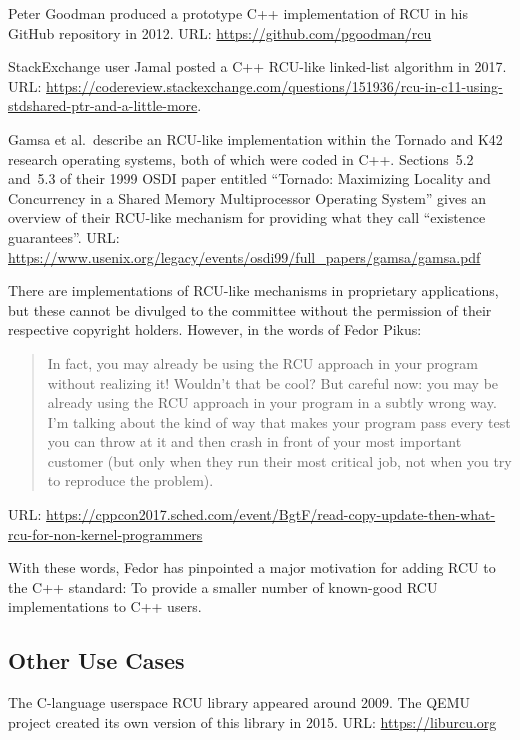 Peter Goodman produced a prototype C++ implementation of RCU in his
GitHub repository in 2012.
URL: \url{https://github.com/pgoodman/rcu}

StackExchange user Jamal posted a C++ RCU-like linked-list algorithm
in 2017.
URL: \url{https://codereview.stackexchange.com/questions/151936/rcu-in-c11-using-stdshared-ptr-and-a-little-more}.

Gamsa et al.~describe an RCU-like implementation within the Tornado
and K42 research operating systems, both of which were coded in C++.
Sections~5.2 and~5.3 of their 1999 OSDI paper entitled ``Tornado: Maximizing
Locality and Concurrency in a Shared Memory Multiprocessor Operating
System'' gives an overview of their RCU-like mechanism for providing
what they call ``existence guarantees''.
URL: \url{https://www.usenix.org/legacy/events/osdi99/full_papers/gamsa/gamsa.pdf}

There are implementations of RCU-like mechanisms in proprietary
applications, but these cannot be divulged to the committee without the
permission of their respective copyright holders.
However, in the words of Fedor Pikus:

\begin{quote}
	In fact, you may already be using the RCU approach in your program
	without realizing it! Wouldn't that be cool? But careful now:
	you may be already using the RCU approach in your program in a
	subtly wrong way. I'm talking about the kind of way that makes
	your program pass every test you can throw at it and then crash
	in front of your most important customer (but only when they
	run their most critical job, not when you try to reproduce
	the problem).
\end{quote}

URL: {\scriptsize \url{https://cppcon2017.sched.com/event/BgtF/read-copy-update-then-what-rcu-for-non-kernel-programmers}}

With these words, Fedor has pinpointed a major motivation for adding
RCU to the C++ standard: To provide a smaller number of known-good RCU
implementations to C++ users.

\subsection{Other Use Cases}
\label{sec:Other Use Cases}

The C-language userspace RCU library appeared around 2009.
The QEMU project created its own version of this library in 2015.
URL: \url{https://liburcu.org}

